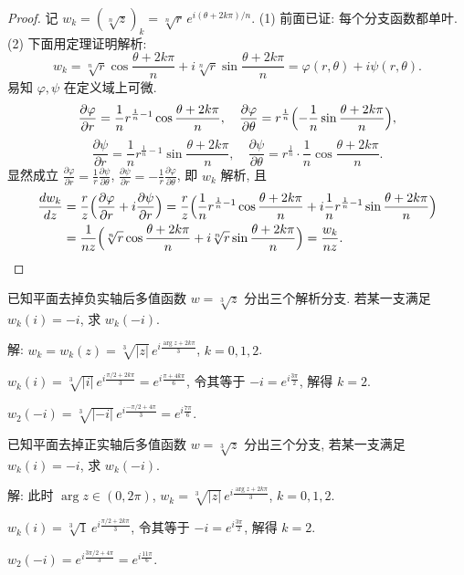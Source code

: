 \documentclass[theorem=false,mathfont=none,openany,sub3section]{easybook}
\begin{document}
\begin{proof}
  记 $w_{k}=(\sqrt[n]{z})_{k}=\sqrt[n]{r}\,e^{i(\theta+2k\pi)/n}$.
  (1) 前面已证: 每个分支函数都单叶.
  (2) 下面用定理证明解析:
  \[
  w_{k}=\sqrt[n]{r}\cos\frac{\theta+2k\pi}{n}+i\sqrt[n]{r}\sin\frac{\theta+2k\pi}{n}=\varphi(r,\theta)+i\psi(r,\theta).
  \]
  易知 $\varphi,\psi$ 在定义域上可微.
  \[
  \frac{\partial\varphi}{\partial r}=\frac{1}{n}r^{\frac{1}{n}-1}\cos\frac{\theta+2k\pi}{n},\quad
  \frac{\partial\varphi}{\partial\theta}=r^{\frac{1}{n}}\Bigl(-\frac{1}{n}\sin\frac{\theta+2k\pi}{n}\Bigr),
  \]
  \[
  \frac{\partial\psi}{\partial r}=\frac{1}{n}r^{\frac{1}{n}-1}\sin\frac{\theta+2k\pi}{n},\quad
  \frac{\partial\psi}{\partial\theta}=r^{\frac{1}{n}}\cdot\frac{1}{n}\cos\frac{\theta+2k\pi}{n}.
  \]
  显然成立 $\frac{\partial\varphi}{\partial r}=\frac{1}{r}\frac{\partial\psi}{\partial\theta}$,
  $\frac{\partial\psi}{\partial r}=-\frac{1}{r}\frac{\partial\varphi}{\partial\theta}$, 即 $w_{k}$ 解析, 且
  \[
  \begin{aligned}
  \frac{dw_{k}}{dz}
  &=\frac{r}{z}\Bigl(\frac{\partial\varphi}{\partial r}+i\frac{\partial\psi}{\partial r}\Bigr)
  =\frac{r}{z}\Bigl(\frac{1}{n}r^{\frac{1}{n}-1}\cos\frac{\theta+2k\pi}{n}
  +i\frac{1}{n}r^{\frac{1}{n}-1}\sin\frac{\theta+2k\pi}{n}\Bigr)\\
  &=\frac{1}{nz}\Bigl(\sqrt[n]{r}\cos\frac{\theta+2k\pi}{n}+i\sqrt[n]{r}\sin\frac{\theta+2k\pi}{n}\Bigr)
  =\frac{w_{k}}{nz}.
  \end{aligned}
  \]
\end{proof}

\begin{example}
  已知平面去掉负实轴后多值函数 $w=\sqrt[3]{z}$ 分出三个解析分支. 若某一支满足 $w_{k}(i)=-i$, 求 $w_{k}(-i)$.\par
  解: $w_{k}=w_{k}(z)=\sqrt[3]{|z|}\,e^{i\frac{\arg z+2k\pi}{3}}$, $k=0,1,2$.\par
  $w_{k}(i)=\sqrt[3]{|i|}\,e^{i\frac{\pi/2+2k\pi}{3}}=e^{i\frac{\pi+4k\pi}{6}}$, 令其等于 $-i=e^{i\frac{3\pi}{2}}$, 解得 $k=2$.\par
  $w_{2}(-i)=\sqrt[3]{|-i|}\,e^{i\frac{-\pi/2+4\pi}{3}}=e^{i\frac{7\pi}{6}}$.
\end{example}

\begin{example}
  已知平面去掉正实轴后多值函数 $w=\sqrt[3]{z}$ 分出三个分支, 若某一支满足 $w_{k}(i)=-i$, 求 $w_{k}(-i)$.\par
  解: 此时 $\arg z\in(0,2\pi)$, $w_{k}=\sqrt[3]{|z|}\,e^{i\frac{\arg z+2k\pi}{3}}$, $k=0,1,2$.\par
  $w_{k}(i)=\sqrt[3]{1}\,e^{i\frac{\pi/2+2k\pi}{3}}$, 令其等于 $-i=e^{i\frac{3\pi}{2}}$, 解得 $k=2$.\par
  $w_{2}(-i)=e^{i\frac{3\pi/2+4\pi}{3}}=e^{i\frac{11\pi}{6}}$.
\end{example}
\end{document}
